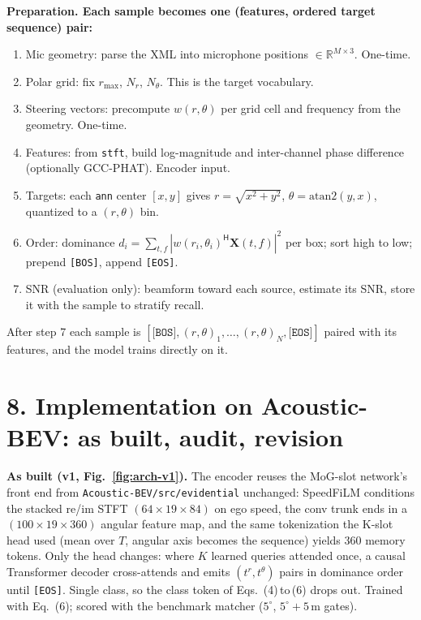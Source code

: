 \documentclass[10pt]{article}
\newcommand{\bos}{\texttt{[BOS]}}
\newcommand{\eos}{\texttt{[EOS]}}
\begin{document}
\textbf{Preparation. Each sample becomes one (features, ordered target sequence) pair:}
\begin{enumerate}
\item Mic geometry: parse the XML into microphone positions $\in\mathbb{R}^{M\times3}$. One-time.
\item Polar grid: fix $r_{\max}$, $N_r$, $N_\theta$. This is the target vocabulary.
\item Steering vectors: precompute $w(r,\theta)$ per grid cell and frequency from the geometry. One-time.
\item Features: from \texttt{stft}, build log-magnitude and inter-channel phase difference (optionally GCC-PHAT). Encoder input.
\item Targets: each \texttt{ann} center $[x,y]$ gives $r=\sqrt{x^2+y^2}$, $\theta=\mathrm{atan2}(y,x)$, quantized to a $(r,\theta)$ bin.
\item Order: dominance $d_i=\sum_{t,f}|w(r_i,\theta_i)^{\mathsf H}\mathbf{X}(t,f)|^2$ per box; sort high to low; prepend \bos, append \eos.
\item SNR (evaluation only): beamform toward each source, estimate its SNR, store it with the sample to stratify recall.
\end{enumerate}
After step 7 each sample is $[\bos,(r,\theta)_1,\dots,(r,\theta)_N,\eos]$ paired with
its features, and the model trains directly on it.

\section*{8. Implementation on Acoustic-BEV: as built, audit, revision}

\textbf{As built (v1, Fig.~\ref{fig:arch-v1}).} The encoder reuses the MoG-slot
network's front end from \texttt{Acoustic-BEV/src/evidential} unchanged: SpeedFiLM
conditions the stacked re/im STFT $(64{\times}19{\times}84)$ on ego speed, the conv
trunk ends in a $(100{\times}19{\times}360)$ angular feature map, and the same
tokenization the K-slot head used (mean over $T$, angular axis becomes the
sequence) yields 360 memory tokens. Only the head changes: where $K$ learned
queries attended once, a causal Transformer decoder cross-attends and emits
$(t^r,t^\theta)$ pairs in dominance order until \eos. Single class, so the class
token of Eqs.~(4)\,to\,(6) drops out. Trained with Eq.~(6); scored with the
benchmark matcher ($5^\circ$, $5^\circ{+}5$\,m gates).
\end{document}
